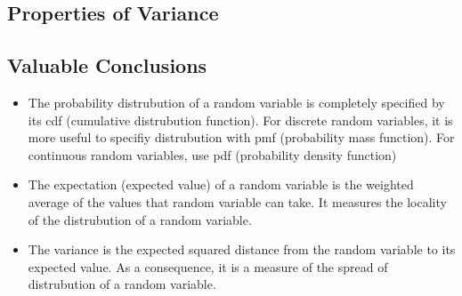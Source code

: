 \documentclass[a6paper]{article}
\theoremstyle{definition}
\theoremstyle{plain}
\newtheorem{theorem}{Theorem}
\theoremstyle{remark}
\begin{document}
  \subsection{Properties of Variance}
  \begin{center}
  \end{center}

  \subsection{Valuable Conclusions}
  \begin{itemize}
    \item The probability distrubution of a random variable is completely
      specified by its cdf (cumulative distrubution function). For discrete
      random variables, it is more useful to specifiy distrubution with pmf
      (probability mass function). For continuous random variables, use pdf
      (probability density function)
    \item The expectation (expected value) of a random variable is the weighted
      average of the values that random variable can take. It measures the
      locality of the distrubution of a random variable.
    \item The variance is the expected squared distance from the random
      variable to its expected value. As a consequence, it is a measure of the
      spread of distrubution of a random variable.
  \end{itemize}
\end{document}
